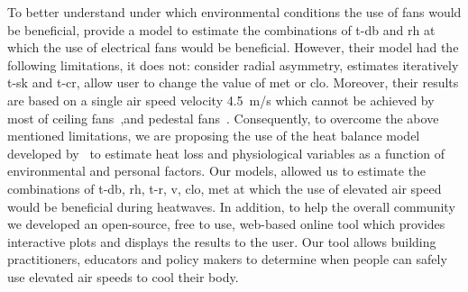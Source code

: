 To better understand under which environmental conditions the use of fans would be beneficial,  provide a model to estimate the combinations of \ac{t-db} and \ac{rh} at which the use of electrical fans would be beneficial.
However, their model had the following limitations, it does not: consider radial asymmetry, estimates iteratively \ac{t-sk} and \ac{t-cr}, allow user to change the value of \ac{met} or \ac{clo}.
Moreover, their results are based on a single air speed velocity 4.5~m/s which cannot be achieved by most of ceiling fans~\cite{Raftery2019},and pedestal fans~\cite{Yang2015a}.
Consequently, to overcome the above mentioned limitations, we are proposing the use of the heat balance model developed by~ to estimate heat loss and physiological variables as a function of environmental and personal factors.
Our models, allowed us to estimate the combinations of \ac{t-db}, \ac{rh}, \ac{t-r}, \ac{v}, \ac{clo}, \ac{met} at which the use of elevated air speed would be beneficial during heatwaves.
In addition, to help the overall community we developed an open-source, free to use, web-based online tool which provides interactive plots and displays the results to the user.
Our tool allows building practitioners, educators and policy makers to determine when people can safely use elevated air speeds to cool their body.

